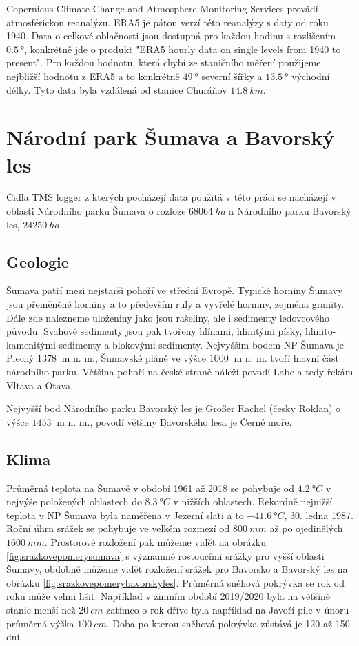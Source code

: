 Copernicus Climate Change and Atmosphere Monitoring Services provádí atmosférickou reanalýzu. ERA5 je pátou verzí této reanalýzy s daty od roku 1940\cite{era5}. Data o celkové oblačnosti jsou dostupná pro každou hodinu s rozlišením $\SI{0.5}{\degree}$, konkrétně jde o produkt "ERA5 hourly data on single levels from 1940 to present". Pro každou hodnotu, která chybí ze staničního měření použijeme nejbližší hodnotu z ERA5 a to konkrétně $\SI{49}{\degree}$ severní šířky a $\SI{13.5}{\degree}$ východní délky. Tyto data byla vzdálená od stanice Churáňov $\SI{14.8}{km}$. 

\section{Národní park Šumava a Bavorský les} \label{chap:sumavabavorskyles}
Čidla TMS logger z kterých pocházejí data použitá v této práci se nacházejí v oblasti Národního parku Šumava o rozloze $\SI{68 064}{ha}$\cite{npsumava} a Národního parku Bavorský les, $\SI{24 250}{ha}$.

\subsection{Geologie}
Šumava patří mezi nejstarší pohoří ve střední Evropě\cite{WildJan2004Cops}. Typické horniny Šumavy jsou přeměněné horniny a to především ruly a vyvřelé horniny, zejména granity. Dále zde nalezneme uloženiny jako jsou rašeliny, ale i sedimenty ledovcového původu. Svahové sedimenty jsou pak tvořeny hlínami, hlinitými písky, hlinito-kamenitými sedimenty a blokovými sedimenty. Nejvyšším bodem NP Šumava je Plechý $\SI{1378}{}$ m n. m., Šumavské pláně ve výšce $\SI{1000}{}$ m n. m. tvoří hlavní část národního parku\cite{npsumava}. Většina pohoří na české straně náleží povodí Labe a tedy řekám Vltava a Otava.

Nejvyšší bod Národního parku Bavorský les je Großer Rachel (česky Roklan) o výšce $\SI{1453}{}$ m n. m., povodí většiny Bavorského lesa je Černé moře.

\subsection{Klima}
Průměrná teplota na Šumavě v období 1961 až 2018 se pohybuje od $\SI{4.2}{\degree C}$ v nejvýše položených oblastech do $\SI{8.3}{\degree C}$ v nižších oblastech. Rekordně nejnižší teplota v NP Šumava byla naměřena v Jezerní slati a to $\SI{-41.6}{\degree C}$, 30. ledna 1987. Roční úhrn srážek se pohybuje ve velkém rozmezí od $\SI{800}{mm}$ až po ojedinělých $\SI{1600}{mm}$. Prostorové rozložení pak můžeme vidět na obrázku \ref{fig:srazkovepomerysumava} s významné rostoucími srážky pro vyšší oblasti Šumavy, obdobně můžeme vidět rozložení srážek pro Bavorsko a Bavorský les na obrázku \ref{fig:srazkovepomerybavorskyles}. Průměrná sněhová pokrývka se rok od roku může velmi lišit. Například v zimním období 2019/2020 byla na většině stanic menší než $\SI{20}{cm}$ zatímco o rok dříve byla například na Javoří pile v únoru průměrná výška $\SI{100}{cm}$\cite{meansnowsumava}. Doba po kterou sněhová pokrývka zůstává je 120 až 150 dní\cite{npsumava}.

